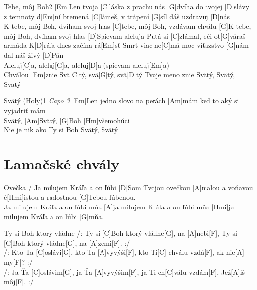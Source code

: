 \documentclass[12pt]{article}
\begin{document}
\begin{song}{Tebe, môj Boh}{2}
	[Em]Len tvoja [C]láska z prachu nás [G]dvíha
	do tvojej [D]slávy z temnoty d[Em]ní
	bremená [C]lámeš, v trápení [G]síl dáš
	uzdravuj [D]nás
	\\
	[Em]K tebe, môj Boh, dvíham svoj hlas
	[C]tebe, môj Boh, vzdávam chválu
	[G]K tebe, môj Boh, dvíham svoj hlas
	[D]Spievam aleluja
	\columnbreak
	[Em]Putá si [C]zlámal, oči ot[G]váraš
	armáda K[D]ráľa dnes začína rá[Em]sť
	Smrť viac ne[C]má moc
	víťazstvo [G]nám dal náš živý [D]Pán
	\\
	[Em]Aleluj[C]a, aleluj[G]a, aleluj[D]a
	(spievam aleluj[Em]a)
	\\
	Chválou [Em]znie
	Svä[C]tý, svä[G]tý, svä[D]tý
	Tvoje meno znie
	Svätý, Svätý, Svätý
\end{song}

\begin{song}{Svätý (Holy)}{1}
\textit{\color{gray}Capo 3}
[Em]Len jedno slovo na perách [Am]mám
keď to aký si vyjadriť mám
\\
[Em]Svätý, [Am]Svätý, [G]Boh [Hm]všemohúci
\\
[Em]Nie je nik ako Ty
si Boh Svätý, Svätý
\columnbreak
\end{song}

\newpage

\section{Lamačské chvály}

\begin{songgroup}{2}
	\begin{groupitem}{Ovečka / Ja milujem Kráľa a on ľúbi}
		[D]Som Tvojou ovečkou	
		[A]malou a voňavou	
		č[Hmi]istou a radostnou 
		[G]Tebou ľúbenou.
		\\
		[D]Ja milujem Kráľa a on ľúbi mňa
		[A]ja milujem Kráľa a on ľúbi mňa
		[Hmi]ja milujem Kráľa a on ľúbi [G]mňa.
	\end{groupitem}
	\columnbreak
	\begin{groupitem}{Ty si Boh ktorý vládne}
		/: Ty si [C]Boh ktorý vládne[G], na [A]nebi[F],  
		Ty si [C]Boh ktorý vládne[G], na [A]zemi[F]. :/ 
		\\
		/: Kto Ťa [C]oslávi[G], kto Ťa [A]vyvýši[F], 
		kto Ti[C] chválu vzdá[F], ak nie[A] my[F]? :/
		\\
		/: Ja Ťa [C]oslávim[G], ja Ťa [A]vyvýšim[F],
		ja Ti ch[C]válu vzdám[F], Jež[A]iš môj[F]. :/
	\end{groupitem}
\end{songgroup}
\end{document}
